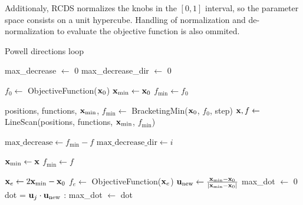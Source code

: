 Additionaly, RCDS normalizes the knobs in the $[0, 1]$ interval, so the parameter space consists on a unit hypercube. Handling of normalization and de-normalization to evaluate the objective function is also ommited.

\begin{algorithm}
    \caption{Powell directions loop}\label{alg:powell}
    \begin{algorithmic}[1]
        \State max\_decrease $\gets$ 0
        \State max\_decrease\_dir $\gets$ 0

        \State $f_0\gets$ ObjectiveFunction($\vb{x}_0$)
        \State $\vb{x}_{\text{min}}\gets \vb{x}_0$
        \State $f_{\text{min}}\gets f_0$

            \State positions, functions, $\vb{x}_{\text{min}}$, $f_{\text{min}}\gets  $ BracketingMin($\vb{x}_0$, $f_0$, step)
            \State $\vb{x}, f \gets$ LineScan(positions, functions, $\vb{x}_{\text{min}}$, $f_{\text{min}}$)

                \State $ \text{max\_decrease}\gets f_{\text{min}} - f$
                \State $ \text{max\_decrease\_dir}\gets i$
            \EndIf

            \State $\vb{x}_{\text{min}}\gets \vb{x}$
            \State $f_{\text{min}}\gets f$

            \State $\vb{x}_e\gets 2 \vb{x}_{\text{min}} - \vb{x}_0$
            \State $f_e \gets$ ObjectiveFunction($\vb{x}_e$)
            \State $\vb{u}_{\text{new}} \gets \frac{\vb{x}_{\text{min}}-\vb{x}_0}{|\vb{x}_{\text{min}}-\vb{x}_0|}$
            \State max\_dot $\gets$ 0
            \State dot = $\vb{u}_j\cdot \vb{u}_{\text{new}}$
            :
                \State max\_dot $\gets$ dot
            \EndIf
            \EndFor


\end{algorithmic}
\end{algorithm}
